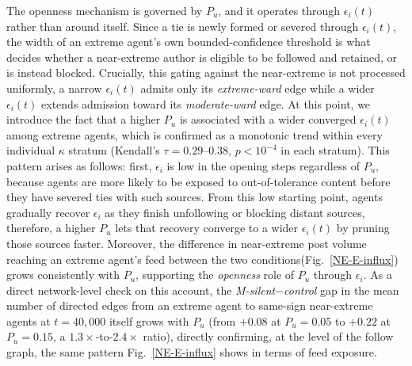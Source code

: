 \documentclass{svproc}
\def\BoundedConfidence{\epsilon} %
\def\VCR{\kappa}                 %
\begin{document}
The openness mechanism is governed by $P_u$, and it operates through
$\BoundedConfidence_i(t)$ rather than around itself. Since a tie 
is newly formed or severed 
through $\BoundedConfidence_i(t)$, the width of an extreme agent's
own bounded-confidence threshold is what decides whether a
near-extreme author is eligible to be followed and retained, or is
instead blocked. Crucially, 
this gating against the near-extreme is not processed uniformly, 
a narrow
$\BoundedConfidence_i(t)$ admits only its \emph{extreme-ward} edge
while a wider $\BoundedConfidence_i(t)$ extends
admission toward its \emph{moderate-ward} edge.
At this point, we introduce the fact 
that a higher $P_u$ is associated
with a wider converged $\BoundedConfidence_i(t)$ among extreme
agents, which is confirmed as
a monotonic trend within every individual $\VCR$ stratum
(Kendall's $\tau=0.29$--$0.38$, $p<10^{-4}$ in each stratum).
This pattern arises as follows:
first, $\BoundedConfidence_i$ is low in the opening steps regardless of
$P_u$, because agents are more likely to be exposed to out-of-tolerance
content before they have severed ties with such sources. 
From this low
starting point, agents gradually recover $\BoundedConfidence_i$ as
they finish unfollowing or blocking distant sources, 
therefore, 
a higher $P_u$ lets that recovery
converge to a wider $\BoundedConfidence_i(t)$ 
by pruning those sources faster. 
Moreover, the
difference in near-extreme post volume reaching an extreme agent's
feed between the two conditions(Fig.~\ref{NE-E-influx}) grows consistently with $P_u$,
supporting the \emph{openness} role of $P_u$
through $\BoundedConfidence_i$. As a direct network-level check on
this account, the \emph{M-silent}$-$\emph{control} gap in the mean 
number of directed edges from an extreme agent to 
same-sign near-extreme agents at $t=40{,}000$ itself grows
with $P_u$ (from $+0.08$ at $P_u=0.05$ to $+0.22$ at $P_u=0.15$, a
$1.3\times$-to-$2.4\times$ ratio), directly confirming, at the level
of the follow graph, the same pattern
Fig.~\ref{NE-E-influx} shows in terms of feed exposure.
\end{document}
